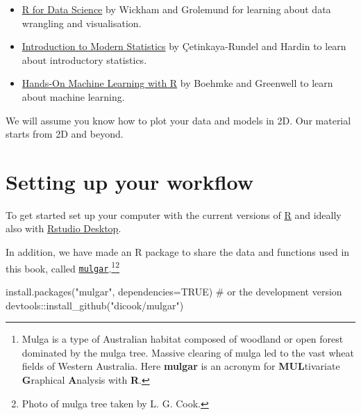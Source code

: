 \documentclass[
  letterpaper,
]{book}
\newenvironment{Shaded}{\begin{snugshade}}{\end{snugshade}}
\newcommand{\AttributeTok}[1]{\textcolor[rgb]{0.40,0.45,0.13}{#1}}
\newcommand{\CommentTok}[1]{\textcolor[rgb]{0.37,0.37,0.37}{#1}}
\newcommand{\ConstantTok}[1]{\textcolor[rgb]{0.56,0.35,0.01}{#1}}
\newcommand{\FunctionTok}[1]{\textcolor[rgb]{0.28,0.35,0.67}{#1}}
\newcommand{\NormalTok}[1]{\textcolor[rgb]{0.00,0.23,0.31}{#1}}
\newcommand{\SpecialCharTok}[1]{\textcolor[rgb]{0.37,0.37,0.37}{#1}}
\newcommand{\StringTok}[1]{\textcolor[rgb]{0.13,0.47,0.30}{#1}}
\providecommand{\tightlist}{%
  \setlength{\itemsep}{0pt}\setlength{\parskip}{0pt}}\usepackage{longtable,booktabs,array}
\begin{document}
\begin{itemize}
\tightlist
\item
  \href{https://r4ds.had.co.nz}{R for Data Science} by Wickham and
  Grolemund for learning about data wrangling and visualisation.
\item
  \href{https://openintro-ims.netlify.app}{Introduction to Modern
  Statistics} by Çetinkaya-Rundel and Hardin to learn about introductory
  statistics.
\item
  \href{https://bradleyboehmke.github.io/HOML/}{Hands-On Machine
  Learning with R} by Boehmke and Greenwell to learn about machine
  learning.
\end{itemize}

We will assume you know how to plot your data and models in 2D. Our
material starts from 2D and beyond.

\hypertarget{setting-up-your-workflow}{%
\section*{Setting up your workflow}\label{setting-up-your-workflow}}


To get started set up your computer with the current versions of
\href{https://cran.r-project.org}{R} and ideally also with
\href{https://posit.co/download/rstudio-desktop/}{Rstudio Desktop}.

In addition, we have made an R package to share the data and functions
used in this book, called
\href{http://dicook.github.io/mulgar}{\texttt{mulgar}}.\footnote{Mulga
  is a type of Australian habitat composed of woodland or open forest
  dominated by the mulga tree. Massive clearing of mulga led to the vast
  wheat fields of Western Australia. Here \textbf{mulgar} is an acronym
  for \textbf{MUL}tivariate \textbf{G}raphical \textbf{A}nalysis with
  \textbf{R}.}\footnote{Photo of mulga tree taken by L. G. Cook.}

\begin{Shaded}
\begin{Highlighting}[]
\FunctionTok{install.packages}\NormalTok{(}\StringTok{"mulgar"}\NormalTok{, }\AttributeTok{dependencies=}\ConstantTok{TRUE}\NormalTok{)}
\CommentTok{\# or the development version}
\NormalTok{devtools}\SpecialCharTok{::}\FunctionTok{install\_github}\NormalTok{(}\StringTok{"dicook/mulgar"}\NormalTok{)}
\end{Highlighting}
\end{Shaded}
\end{document}
